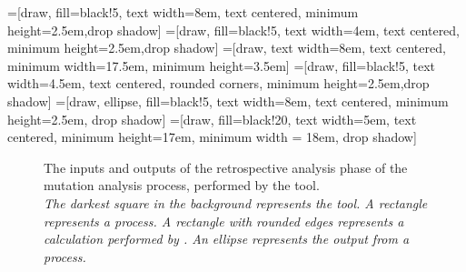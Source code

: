 \newcommand{\mx}[1]{\mathbf{\bm{#1}}} %
\newcommand{\vc}[1]{\mathbf{\bm{#1}}} %



=[draw, fill=black!5, text width=8em,
    text centered, minimum height=2.5em,drop shadow]
=[draw, fill=black!5, text width=4em,
    text centered, minimum height=2.5em,drop shadow]
=[draw, text width=8em,
    text centered, minimum width=17.5em, minimum height=3.5em]
=[draw, fill=black!5, text width=4.5em,
    text centered, rounded corners, minimum height=2.5em,drop shadow]
=[draw, ellipse, fill=black!5, text width=8em,
    text centered, minimum height=2.5em, drop shadow]
=[draw, fill=black!20, text width=5em,
    text centered, minimum height=17em, minimum width = 18em, drop shadow]

\def\blockdist{1.5}
\def\edgedist{2.5}

\begin{figure}[t]
  \centering
\caption{\label{fig:mrstudyr}The inputs and outputs of the retrospective analysis phase
of the mutation analysis process, performed by the \mr tool. \\
\textit{The darkest square in the background represents the \mr tool.
A rectangle represents a process. A rectangle with rounded edges represents a
calculation performed by \mr. An ellipse represents the output from a process.}}
\vspace{-1.5em}
\end{figure}

